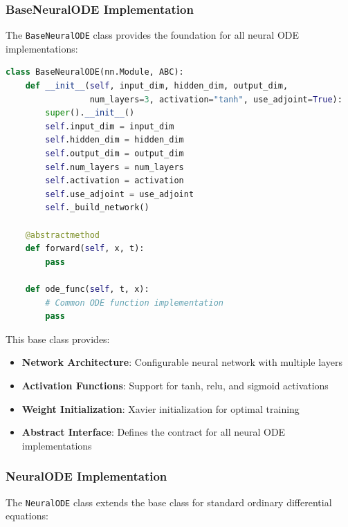 \lstset{
    basicstyle=\ttfamily\footnotesize,
    breaklines=true,
    breakatwhitespace=true,
    columns=fullflexible,
    keepspaces=true,
    showstringspaces=false,
    frame=none,
    xleftmargin=2em,
    xrightmargin=0em
}

\subsubsection{BaseNeuralODE Implementation}

The \texttt{BaseNeuralODE} class provides the foundation for all neural ODE implementations:

\begin{lstlisting}[language=Python, caption=BaseNeuralODE Base Class]
class BaseNeuralODE(nn.Module, ABC):
    def __init__(self, input_dim, hidden_dim, output_dim, 
                 num_layers=3, activation="tanh", use_adjoint=True):
        super().__init__()
        self.input_dim = input_dim
        self.hidden_dim = hidden_dim
        self.output_dim = output_dim
        self.num_layers = num_layers
        self.activation = activation
        self.use_adjoint = use_adjoint
        self._build_network()
    
    @abstractmethod
    def forward(self, x, t):
        pass
    
    def ode_func(self, t, x):
        # Common ODE function implementation
        pass
\end{lstlisting}

This base class provides:
\begin{itemize}
    \item \textbf{Network Architecture}: Configurable neural network with multiple layers
    \item \textbf{Activation Functions}: Support for tanh, relu, and sigmoid activations
    \item \textbf{Weight Initialization}: Xavier initialization for optimal training
    \item \textbf{Abstract Interface}: Defines the contract for all neural ODE implementations
\end{itemize}

\subsubsection{NeuralODE Implementation}

The \texttt{NeuralODE} class extends the base class for standard ordinary differential equations:

